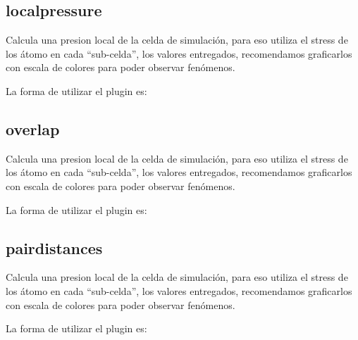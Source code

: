 \subsection{localpressure}

Calcula una presion local de la celda de simulaci\'on, para eso utiliza el
stress de los \'atomo en cada ``sub-celda'', los valores entregados,
recomendamos graficarlos con escala de colores para poder observar fen\'omenos. 

La forma de utilizar el plugin es:

\subsection{overlap}

Calcula una presion local de la celda de simulaci\'on, para eso utiliza el
stress de los \'atomo en cada ``sub-celda'', los valores entregados,
recomendamos graficarlos con escala de colores para poder observar fen\'omenos. 

La forma de utilizar el plugin es:

\subsection{pairdistances}

Calcula una presion local de la celda de simulaci\'on, para eso utiliza el
stress de los \'atomo en cada ``sub-celda'', los valores entregados,
recomendamos graficarlos con escala de colores para poder observar fen\'omenos. 

La forma de utilizar el plugin es:

